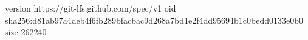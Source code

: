 version https://git-lfs.github.com/spec/v1
oid sha256:d81ab97a4deb4f6fb289bfacbac9d268a7bd1e2f4dd95694b1c0bedd0133e0b0
size 262240
